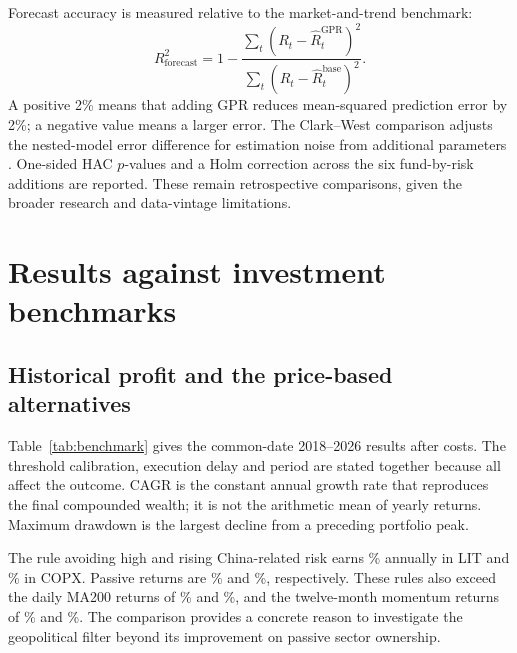 Forecast accuracy is measured relative to the market-and-trend benchmark:
\begin{equation}
R^2_{\mathrm{forecast}}
=1-\frac{\sum_t(R_t-\widehat R^{\mathrm{GPR}}_t)^2}
         {\sum_t(R_t-\widehat R^{\mathrm{base}}_t)^2}.
\label{eq:r2}
\end{equation}
A positive 2\% means that adding GPR reduces mean-squared prediction error by 2\%; a negative value means a larger error. The Clark–West comparison adjusts the nested-model error difference for estimation noise from additional parameters \citep{clark2007}. One-sided HAC $p$-values and a Holm correction across the six fund-by-risk additions are reported. These remain retrospective comparisons, given the broader research and data-vintage limitations.

\section{Results against investment benchmarks}
\subsection{Historical profit and the price-based alternatives}

Table~\ref{tab:benchmark} gives the common-date 2018–2026 results after costs. The threshold calibration, execution delay and period are stated together because all affect the outcome. CAGR is the constant annual growth rate that reproduces the final compounded wealth; it is not the arithmetic mean of yearly returns. Maximum drawdown is the largest decline from a preceding portfolio peak.

\begin{table}[!htbp]
\centering\small
\caption{Net annualised returns, 15 March 2018–30 October 2026}
\label{tab:benchmark}

\end{table}

The rule avoiding high and rising China-related risk earns \OosLitAvoidCagr\% annually in LIT and \OosCopxAvoidCagr\% in COPX. Passive returns are \OosLitPassiveCagr\% and \OosCopxPassiveCagr\%, respectively. These rules also exceed the daily MA200 returns of \OosLitDailyMACagr\% and \OosCopxDailyMACagr\%, and the twelve-month momentum returns of \OosLitMomentumCagr\% and \OosCopxMomentumCagr\%. The comparison provides a concrete reason to investigate the geopolitical filter beyond its improvement on passive sector ownership.

